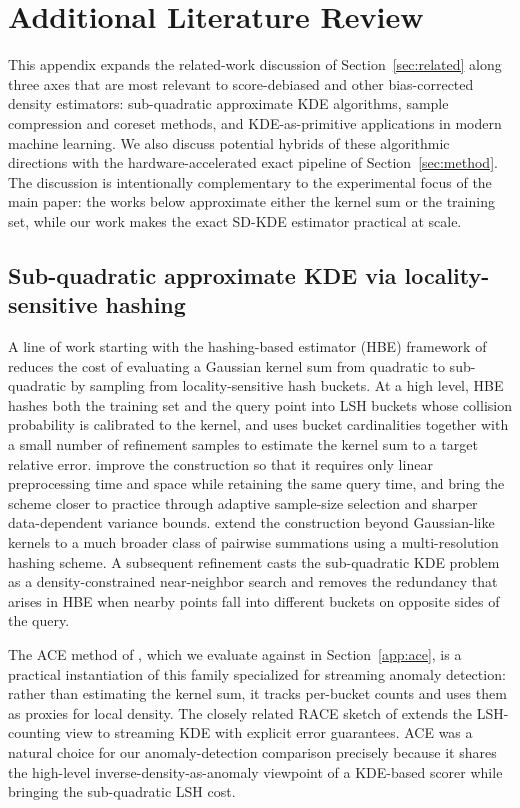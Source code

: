 \section{Additional Literature Review}
\label{app:additional_literature}

This appendix expands the related-work discussion of
Section~\ref{sec:related} along three axes that are most relevant to
score-debiased and other bias-corrected density estimators: sub-quadratic
approximate KDE algorithms, sample compression and coreset methods, and
KDE-as-primitive applications in modern machine learning.
We also discuss potential hybrids of these algorithmic directions with the
hardware-accelerated exact pipeline of Section~\ref{sec:method}.
The discussion is intentionally complementary to the experimental focus of
the main paper: the works below approximate either the kernel sum or the
training set, while our work makes the exact SD-KDE estimator practical at
scale.

\subsection{Sub-quadratic approximate KDE via locality-sensitive hashing}
\label{app:hbe_literature}

A line of work starting with the hashing-based estimator (HBE) framework of
\citet{charikar2017hbe} reduces the cost of evaluating a Gaussian kernel
sum from quadratic to sub-quadratic by sampling from locality-sensitive
hash buckets.
At a high level, HBE hashes both the training set and the query point into
LSH buckets whose collision probability is calibrated to the kernel, and
uses bucket cardinalities together with a small number of refinement
samples to estimate the kernel sum to a target relative error.
\citet{backurs2019space} improve the construction so that it requires only
linear preprocessing time and space while retaining the same query time,
and \citet{siminelakis2019rehashing} bring the scheme closer to practice
through adaptive sample-size selection and sharper data-dependent variance
bounds.
\citet{charikar2019multi} extend the construction beyond Gaussian-like
kernels to a much broader class of pairwise summations using a
multi-resolution hashing scheme.
A subsequent refinement \citep{charikar2020kde} casts the sub-quadratic KDE
problem as a density-constrained near-neighbor search and removes the
redundancy that arises in HBE when nearby points fall into different
buckets on opposite sides of the query.

The ACE method of \citet{luo2018ace}, which we evaluate against in
Section~\ref{app:ace}, is a practical instantiation of this family
specialized for streaming anomaly detection: rather than estimating the
kernel sum, it tracks per-bucket counts and uses them as proxies for local
density.
The closely related RACE sketch of \citet{coleman2020race} extends the
LSH-counting view to streaming KDE with explicit error guarantees.
ACE was a natural choice for our anomaly-detection comparison precisely
because it shares the high-level inverse-density-as-anomaly viewpoint of a
KDE-based scorer while bringing the sub-quadratic LSH cost.

